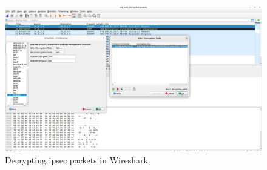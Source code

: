 \begin{figure}[h]
	\centering
	\includegraphics[width=\linewidth]{images/wireshark_decryption}
	\caption{Decrypting \ac{ipsec} packets in Wireshark.}
	\label{fig:wiresharkdecryption}
\end{figure}

